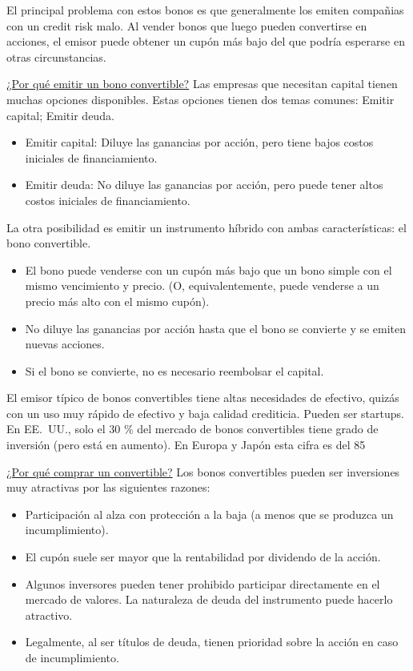 El principal problema con estos bonos es que generalmente los emiten compañias con un credit risk malo. Al vender bonos que luego pueden convertirse en acciones, el emisor puede obtener un cupón más bajo del que podría esperarse en otras circunstancias.

\underline{¿Por qué emitir un bono convertible?}
Las empresas que necesitan capital tienen muchas opciones disponibles. Estas opciones tienen dos temas comunes: Emitir capital; Emitir deuda.
\begin{itemize}
    \item Emitir capital: Diluye las ganancias por acción, pero tiene bajos costos iniciales de financiamiento.
    \item Emitir deuda: No diluye las ganancias por acción, pero puede tener altos costos iniciales de financiamiento.
\end{itemize}
La otra posibilidad es emitir un instrumento híbrido con ambas características: el bono convertible.
\begin{itemize}
    \item El bono puede venderse con un cupón más bajo que un bono simple con el mismo vencimiento y precio. (O, equivalentemente, puede venderse a un precio más alto con el mismo cupón).
    \item No diluye las ganancias por acción hasta que el bono se convierte y se emiten nuevas acciones.
    \item Si el bono se convierte, no es necesario reembolsar el capital.
\end{itemize}
El emisor típico de bonos convertibles tiene altas necesidades de efectivo, quizás con un uso muy rápido de efectivo y baja calidad crediticia. Pueden ser startups. En EE.\ UU., solo el 30 \% del mercado de bonos convertibles tiene grado de inversión (pero está en aumento). En Europa y Japón esta cifra es del 85%

\underline{¿Por qué comprar un convertible?}
Los bonos convertibles pueden ser inversiones muy atractivas por las siguientes razones:
\begin{itemize}
    \item Participación al alza con protección a la baja (a menos que se produzca un incumplimiento).
    \item El cupón suele ser mayor que la rentabilidad por dividendo de la acción.
    \item Algunos inversores pueden tener prohibido participar directamente en el mercado de valores. La naturaleza de deuda del instrumento puede hacerlo atractivo.
    \item Legalmente, al ser títulos de deuda, tienen prioridad sobre la acción en caso de incumplimiento.
\end{itemize}

